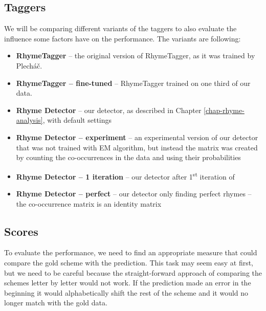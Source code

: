 \subsection{Taggers}
We will be comparing different variants of the taggers to also evaluate the influence some factors have on the performance. The variants are following:
\begin{itemize}
	\item \textbf{RhymeTagger} -- the original version of RhymeTagger, as it was trained by Plecháč.
	\item \textbf{RhymeTagger -- fine-tuned} -- RhymeTagger trained on one third of our data.
	\item \textbf{Rhyme Detector} -- our detector, as described in Chapter \ref{chap-rhyme-analysis}, with  default settings
	\item \textbf{Rhyme Detector -- experiment} -- an experimental version of our detector\deleted{,} that was not trained with  EM algorithm, but instead the matrix was created by counting the co-occurrences in the data and using their probabilities
	\item \textbf{Rhyme Detector -- 1 iteration} -- our detector after  1\textsuperscript{st} iteration of 
	\item \textbf{Rhyme Detector -- perfect} -- our detector  only finding perfect rhymes -- the co-occurrence matrix is an identity matrix
\end{itemize}

\subsection{Scores}
To evaluate the performance, we need to find an appropriate measure that could compare the gold scheme with the prediction. This task may seem easy at first, but we need to be careful because the straight-forward approach of comparing the schemes letter by letter would not work. If the prediction made an error in the beginning it would alphabetically shift the rest of the scheme and it would no longer match with the gold data.

